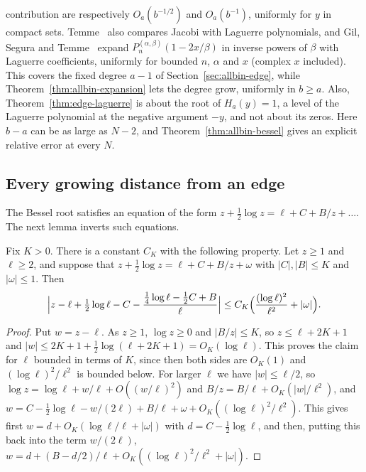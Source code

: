 \begin{remark}
contribution are respectively $O_a(b^{-1/2})$ and $O_a(b^{-1})$, uniformly
for $y$ in compact sets. Temme~\cite[Section~4.2]{temme1990} also compares
Jacobi with Laguerre polynomials, and Gil, Segura and
Temme~\cite[Section~2 and Remark~1]{gil2018} expand
$P_n^{(\alpha,\beta)}(1-2x/\beta)$ in inverse powers of $\beta$ with
Laguerre coefficients, uniformly for bounded $n$, $\alpha$ and $x$ (complex
$x$ included). This covers the fixed degree $a-1$ of
Section~\ref{sec:allbin-edge}, while Theorem~\ref{thm:allbin-expansion} lets
the degree grow, uniformly in $b\ge a$. Also, Theorem~\ref{thm:edge-laguerre}
is about the root of $H_a(y)=1$, a level of the Laguerre polynomial at the
negative argument $-y$, and not about its zeros. Here $b-a$ can be as large as
$N-2$, and Theorem~\ref{thm:allbin-bessel} gives an explicit relative error at
every $N$.
\end{remark}

\subsection{Every growing distance from an edge}\label{sec:allbin-growing}

The Bessel root satisfies an equation of the form
$z+\frac12\log z=\ell+C+B/z+\dots$. The next lemma inverts such equations.

\begin{lemma}\label{lem:inversion}
Fix $K>0$. There is a constant $C_K$ with the following property. Let $z\ge1$
and $\ell\ge2$, and suppose that $z+\tfrac12\log z=\ell+C+B/z+\omega$ with
$|C|,|B|\le K$ and $|\omega|\le1$. Then
\[
\Bigl|z-\ell+\tfrac12\log\ell-C-\frac{\frac14\log\ell-\frac12C+B}{\ell}\Bigr|
\le C_K\Bigl(\frac{(\log\ell)^2}{\ell^2}+|\omega|\Bigr).
\]
\end{lemma}

\begin{proof}
Put $w=z-\ell$. As $z\ge1$, $\log z\ge0$ and $|B/z|\le K$, so $z\le\ell+2K+1$
and $|w|\le2K+1+\frac12\log(\ell+2K+1)=O_K(\log\ell)$. This proves the claim
for $\ell$ bounded in terms of $K$, since then both sides are $O_K(1)$ and
$(\log\ell)^2/\ell^2$ is bounded below. For larger $\ell$ we have
$|w|\le\ell/2$, so $\log z=\log\ell+w/\ell+O((w/\ell)^2)$ and
$B/z=B/\ell+O_K(|w|/\ell^2)$, and
$w=C-\frac12\log\ell-w/(2\ell)+B/\ell+\omega+O_K((\log\ell)^2/\ell^2)$. This
gives first $w=d+O_K(\log\ell/\ell+|\omega|)$ with $d=C-\frac12\log\ell$, and
then, putting this back into the term $w/(2\ell)$,
$w=d+(B-d/2)/\ell+O_K((\log\ell)^2/\ell^2+|\omega|)$.
\end{proof}

